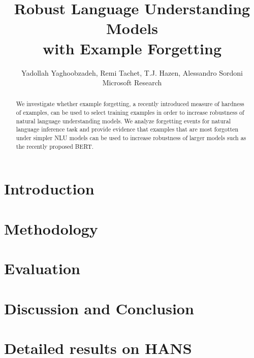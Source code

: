 \documentclass[11pt,a4paper]{article}
\title{Robust Language Understanding Models \\ with Example Forgetting}
\author{%
  Yadollah Yaghoobzadeh, Remi Tachet, T.J. Hazen, Alessandro Sordoni \\
  Microsoft Research \\
}
\begin{document}
\maketitle

\begin{abstract}
We investigate whether example forgetting, a recently introduced measure of hardness of examples, can be used to select training examples in order to increase robustness of natural language understanding models. We analyze forgetting events for natural language inference task and provide evidence that examples that are most forgotten under simpler NLU models can be used to increase robustness of larger models such as the recently proposed BERT.  
\end{abstract}

\section{Introduction}


\section{Methodology}


\section{Evaluation}



\iffalse
\section{Analysis}

\fi


\section{Discussion and Conclusion}





\appendix
\section{Detailed results on HANS}
\label{sec:detailedresults}

\end{document}

